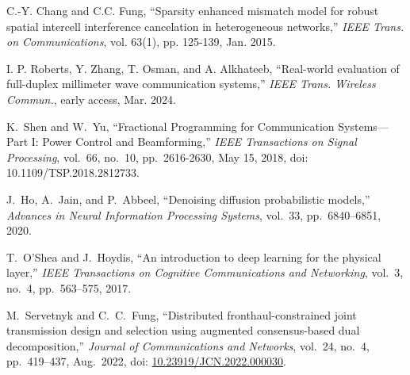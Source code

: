 \documentclass[10pt]{article}
\begin{document}
\appendix{}




\begin{thebibliography}{99}

C.-Y. Chang and C.C. Fung, ``Sparsity enhanced mismatch model for robust spatial intercell interference cancelation in heterogeneous networks,'' \emph{IEEE Trans. on Communications}, vol. 63(1), pp. 125-139, Jan. 2015.

I. P. Roberts, Y. Zhang, T. Osman, and A. Alkhateeb, ``Real-world evaluation of full-duplex millimeter wave communication systems,'' \emph{IEEE Trans. Wireless Commun.}, early access, Mar. 2024.

K.~Shen and W.~Yu, ``Fractional Programming for Communication Systems—Part I: Power Control and Beamforming,'' \textit{IEEE Transactions on Signal Processing}, vol.~66, no.~10, pp.~2616-2630, May 15, 2018, doi: 10.1109/TSP.2018.2812733.

J.~Ho, A.~Jain, and P.~Abbeel, ``Denoising diffusion probabilistic models,'' 
\emph{Advances in Neural Information Processing Systems}, vol.~33, pp.~6840--6851, 2020.

T.~O’Shea and J.~Hoydis, ``An introduction to deep learning for the physical layer,'' 
\emph{IEEE Transactions on Cognitive Communications and Networking}, vol.~3, no.~4, pp.~563--575, 2017.

M.~Servetnyk and C.~C.~Fung, ``Distributed fronthaul-constrained joint transmission design and selection using augmented consensus-based dual decomposition,'' \textit{Journal of Communications and Networks}, vol.~24, no.~4, pp.~419--437, Aug.~2022, doi: \href{https://doi.org/10.23919/JCN.2022.000030}{10.23919/JCN.2022.000030}.

\end{thebibliography}
\end{document}
